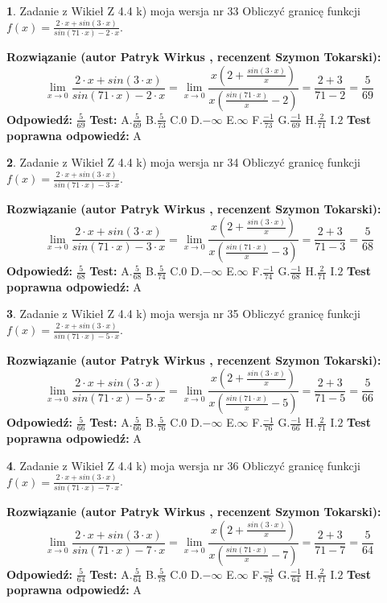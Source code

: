 \documentclass[12pt, a4paper]{article}
\theoremstyle{definition} %
\newtheorem{zad}{}
\newcommand{\zadStart}[1]{\begin{zad}#1\newline}
\newcommand{\zadStop}{\end{zad}}
\newcommand{\rozwStart}[2]{\noindent \textbf{Rozwiązanie (autor #1 , recenzent #2): }\newline}
\newcommand{\rozwStop}{\newline}
\newcommand{\odpStart}{\noindent \textbf{Odpowiedź:}\newline}
\newcommand{\odpStop}{\newline}
\newcommand{\testStart}{\noindent \textbf{Test:}\newline}
\newcommand{\testStop}{\newline}
\newcommand{\kluczStart}{\noindent \textbf{Test poprawna odpowiedź:}\newline}
\newcommand{\kluczStop}{\newline}
\begin{document}
\zadStart{Zadanie z Wikieł Z 4.4 k) moja wersja nr 33}
Obliczyć granicę funkcji $f(x)=\frac{2\cdot x +sin(3\cdot x)}{sin(71\cdot x) -2\cdot x}$.
\zadStop
\rozwStart{Patryk Wirkus}{Szymon Tokarski}
$$\lim\limits_{x\to 0}\frac{2\cdot x +sin(3\cdot x)}{sin(71\cdot x) -2\cdot x}
=\lim\limits_{x\to 0}\frac{x(2+\frac{sin(3\cdot x)}{x})}{x(\frac{sin(71\cdot x)}{x}-2)}
=\frac{2+3}{71-2} = \frac{5}{69}$$
\rozwStop
\odpStart
$\frac{5}{69}$
\odpStop
\testStart
A.$\frac{5}{69}$
B.$\frac{5}{73}$
C.$0$
D.$-\infty$
E.$\infty$
F.$\frac{-1}{73}$
G.$\frac{-1}{69}$
H.$\frac{2}{71}$
I.$2$
\testStop
\kluczStart
A
\kluczStop



\zadStart{Zadanie z Wikieł Z 4.4 k) moja wersja nr 34}
Obliczyć granicę funkcji $f(x)=\frac{2\cdot x +sin(3\cdot x)}{sin(71\cdot x) -3\cdot x}$.
\zadStop
\rozwStart{Patryk Wirkus}{Szymon Tokarski}
$$\lim\limits_{x\to 0}\frac{2\cdot x +sin(3\cdot x)}{sin(71\cdot x) -3\cdot x}
=\lim\limits_{x\to 0}\frac{x(2+\frac{sin(3\cdot x)}{x})}{x(\frac{sin(71\cdot x)}{x}-3)}
=\frac{2+3}{71-3} = \frac{5}{68}$$
\rozwStop
\odpStart
$\frac{5}{68}$
\odpStop
\testStart
A.$\frac{5}{68}$
B.$\frac{5}{74}$
C.$0$
D.$-\infty$
E.$\infty$
F.$\frac{-1}{74}$
G.$\frac{-1}{68}$
H.$\frac{2}{71}$
I.$2$
\testStop
\kluczStart
A
\kluczStop



\zadStart{Zadanie z Wikieł Z 4.4 k) moja wersja nr 35}
Obliczyć granicę funkcji $f(x)=\frac{2\cdot x +sin(3\cdot x)}{sin(71\cdot x) -5\cdot x}$.
\zadStop
\rozwStart{Patryk Wirkus}{Szymon Tokarski}
$$\lim\limits_{x\to 0}\frac{2\cdot x +sin(3\cdot x)}{sin(71\cdot x) -5\cdot x}
=\lim\limits_{x\to 0}\frac{x(2+\frac{sin(3\cdot x)}{x})}{x(\frac{sin(71\cdot x)}{x}-5)}
=\frac{2+3}{71-5} = \frac{5}{66}$$
\rozwStop
\odpStart
$\frac{5}{66}$
\odpStop
\testStart
A.$\frac{5}{66}$
B.$\frac{5}{76}$
C.$0$
D.$-\infty$
E.$\infty$
F.$\frac{-1}{76}$
G.$\frac{-1}{66}$
H.$\frac{2}{71}$
I.$2$
\testStop
\kluczStart
A
\kluczStop



\zadStart{Zadanie z Wikieł Z 4.4 k) moja wersja nr 36}
Obliczyć granicę funkcji $f(x)=\frac{2\cdot x +sin(3\cdot x)}{sin(71\cdot x) -7\cdot x}$.
\zadStop
\rozwStart{Patryk Wirkus}{Szymon Tokarski}
$$\lim\limits_{x\to 0}\frac{2\cdot x +sin(3\cdot x)}{sin(71\cdot x) -7\cdot x}
=\lim\limits_{x\to 0}\frac{x(2+\frac{sin(3\cdot x)}{x})}{x(\frac{sin(71\cdot x)}{x}-7)}
=\frac{2+3}{71-7} = \frac{5}{64}$$
\rozwStop
\odpStart
$\frac{5}{64}$
\odpStop
\testStart
A.$\frac{5}{64}$
B.$\frac{5}{78}$
C.$0$
D.$-\infty$
E.$\infty$
F.$\frac{-1}{78}$
G.$\frac{-1}{64}$
H.$\frac{2}{71}$
I.$2$
\testStop
\kluczStart
A
\kluczStop
\end{document}
